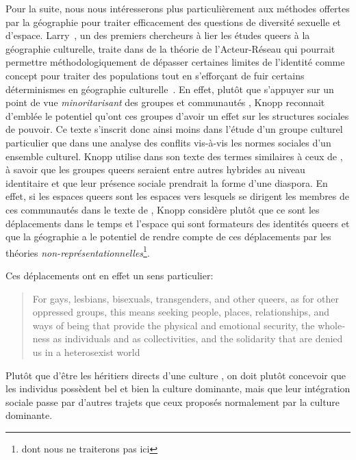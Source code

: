 Pour la suite, nous nous intéresserons plus particulièrement aux méthodes offertes par la géographie pour traiter efficacement des questions de diversité sexuelle et d'espace. 
Larry~\citet{Knopp2004}, un des premiers chercheurs à lier les études queers à la géographie culturelle, traite dans  de la théorie de l'Acteur-Réseau qui pourrait permettre méthodologiquement de dépasser certaines limites de l'identité comme concept pour traiter des populations \lgbt{} tout en s’efforçant de fuir certains déterminismes en géographie culturelle~\citep{Knopp2004}. 
En effet, plutôt que s'appuyer sur un point de vue \emph{minoritarisant} des groupes et communautés \lgbt{}, Knopp reconnait d'emblée le potentiel qu'ont ces groupes d'avoir un effet sur les structures sociales de pouvoir. 
Ce texte s'inscrit donc ainsi moins dans l'étude d'un groupe culturel particulier que dans une analyse des conflits vis-à-vis les normes sociales d'un ensemble culturel. 
Knopp utilise dans son texte des termes similaires à ceux de \citet{Sinfield1996}, à savoir que les groupes queers seraient entre autres hybrides au niveau identitaire et que leur présence sociale prendrait la forme d'une diaspora. 
En effet, si les espaces queers sont les espaces vers lesquels se dirigent les membres de ces communautés dans le texte de \citet{Sinfield1996}, Knopp considère plutôt que ce sont les déplacements dans le temps et l'espace qui sont formateurs des identités queers et que la géographie a le potentiel de rendre compte de ces déplacements par les théories \emph{non-représentationnelles}\footnote{dont nous ne traiterons pas ici}.

Ces déplacements ont en effet un sens particulier: \foreignblockquote{english}[{\cite[123]{Knopp2004}}][.]{For gays, lesbians, bisexuals, transgenders, and other queers, as for other oppressed groups, this means seeking people, places, relationships, and ways of being that provide the physical and emotional security, the wholeness as individuals and as collectivities, and the solidarity that are denied us in a heterosexist world}
Plutôt que d'être les héritiers directs d'une culture \qu{}, on doit plutôt concevoir que les individus \qus{} possèdent bel et bien la culture dominante, mais que leur intégration sociale passe par d'autres trajets que ceux proposés normalement par la culture dominante.

